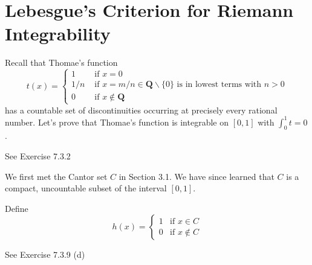 \section{Lebesgue's Criterion for Riemann Integrability}
\begin{exercise} Recall that Thomae's function
$$
t(x)= \begin{cases}1 & \text { if } x=0 \\ 1 / n & \text { if } x=m / n \in \mathbf{Q} \backslash\{0\} \text { is in lowest terms with } n>0 \\ 0 & \text { if } x \notin \mathbf{Q}\end{cases}
$$
has a countable set of discontinuities occurring at precisely every rational number. Let's prove that Thomae's function is integrable on \([0,1]\) with \(\int^1_0 t = 0\).
\end{exercise}
\begin{solution}
See Exercise 7.3.2
\end{solution}

\begin{exercise}
We first met the Cantor set \(C\) in Section 3.1. We have since learned that \(C\) is a compact, uncountable subset of the interval \([0, 1]\).

Define \[h(x) = \begin{cases}
   1 & \text{if } x \in C \\
   0 & \text{if }x \notin C
\end{cases}\]

\end{exercise}
\begin{solution}
    See Exercise 7.3.9 (d)
\end{solution}

